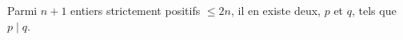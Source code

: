 Parmi $n + 1$ entiers strictement positifs $\leq 2n$, il en existe deux, $p$ et $q$, tels que $p \mid q$.
